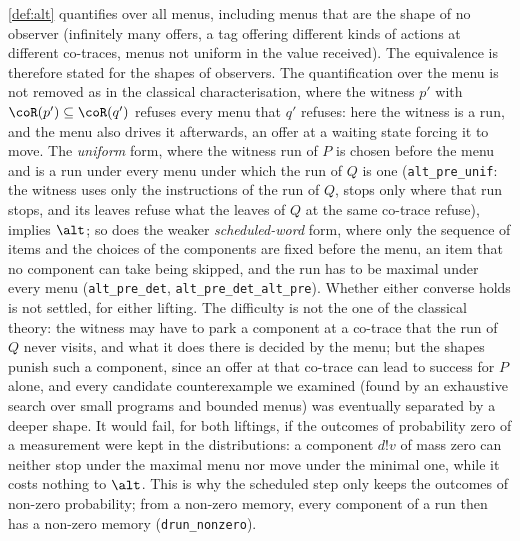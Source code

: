 \begin{remark}
\cref{def:alt} quantifies over all menus, including menus that are the shape
of no observer (infinitely many offers, a tag offering different kinds of
actions at different co-traces, menus not uniform in the value received).
The equivalence is therefore stated for the shapes of observers. The
quantification over the menu is not removed as in the classical
characterisation, where the witness $p'$ with $\coR(p') \subseteq
\coR(q')$ refuses every menu that $q'$ refuses: here the witness is a run,
and the menu also drives it afterwards, an offer at a waiting state forcing
it to move. The \emph{uniform} form, where the witness run of $P$ is chosen
before the menu and is a run under every menu under which the run of $Q$ is
one (\texttt{alt\_pre\_unif}: the witness uses only the instructions of the
run of $Q$, stops only where that run stops, and its leaves refuse what the
leaves of $Q$ at the same co-trace refuse), implies $\alt$; so does the
weaker \emph{scheduled-word} form, where only the sequence of items and the
choices of the components are fixed before the menu, an item that no
component can take being skipped, and the run has to be maximal under every
menu (\texttt{alt\_pre\_det}, \texttt{alt\_pre\_det\_alt\_pre}). Whether
either converse holds is not settled, for either lifting. The
difficulty is not the one of the classical theory: the witness may have to
park a component at a co-trace that the run of $Q$ never visits, and what
it does there is decided by the menu; but the shapes punish such a
component, since an offer at that co-trace can lead to success for $P$
alone, and every candidate counterexample we examined (found by an
exhaustive search over small programs and bounded menus) was eventually
separated by a deeper shape. It would fail, for both liftings, if the
outcomes of probability zero of a measurement were kept in the
distributions: a component $d!v$ of
mass zero can neither stop under the maximal menu nor move under the
minimal one, while it costs nothing to $\alt$. This is why the scheduled
step only keeps the outcomes of non-zero probability; from a non-zero
memory, every component of a run then has a non-zero memory
(\texttt{drun\_nonzero}).
\end{remark}
